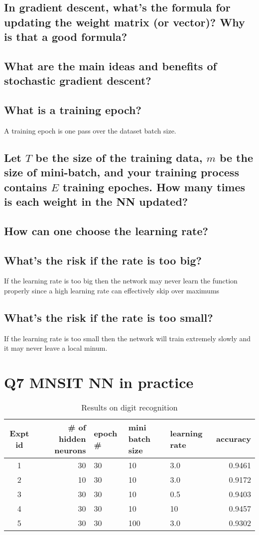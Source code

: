 \documentclass[11pt]{article}
\begin{document}
\subsection{In gradient descent, what's the formula for updating the weight matrix (or vector)? Why is that a good formula?}

\subsection{What are the main ideas and benefits of stochastic gradient descent?}

\subsection{What is a training epoch?}
A training epoch is one pass over the dataset batch size.
\subsection{Let $T$ be the size of the training data, $m$ be the size of mini-batch, and your training process contains $E$ training epoches. How many times is each weight in the NN updated? }
\subsection{How can one choose the learning rate?}

\subsection{What's the risk if the rate is too big?}
If the learning rate is too big then the network may never learn the function properly since a high learning rate can effectively skip over maximums
\subsection{What's the risk if the rate is too small?}
If the learning rate is too small then the network will train extremely slowly and it may never leave a local minum.
\section{Q7 MNSIT NN in practice}
\begin{table}[h]
\centering
\caption{Results on digit recognition}
\label{table1}
\begin{tabular}{|c|r|l|l|l|r|} \hline
  Expt id & \# of hidden neurons & epoch \# & mini batch size & learning rate & accuracy \\ \hline
  1  & 30   & 30 & 10 & 3.0 & 0.9461 \\ \hline
  2  & 10   & 30 & 10 & 3.0 & 0.9172 \\ \hline
  3  & 30   & 30 & 10 & 0.5 & 0.9403 \\ \hline
  4  & 30   & 30 & 10 & 10  & 0.9457 \\ \hline       
  5  & 30   & 30 & 100 & 3.0 & 0.9302 \\ \hline       
\end{tabular}
\end{table}  
 
\end{document}
